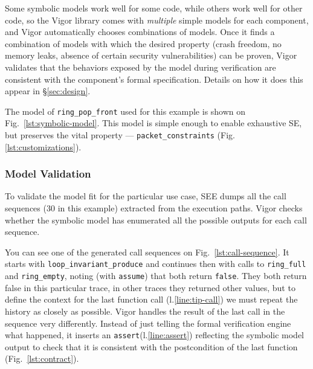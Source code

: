 \documentclass[letterpaper,twocolumn,10pt]{article}
\newcommand{\code}[1]{\lstinline{#1}}
\begin{document}
Some symbolic models work well for some code, while others work well for other
code, so the Vigor library comes with {\em multiple} simple models for each
component, and Vigor automatically chooses combinations of models. Once it finds
a combination of models with which the desired property (crash freedom, no
memory leaks, absence of certain security vulnerabilities) can be proven, Vigor
validates that the behaviors exposed by the model during verification are
consistent with the component's formal specification. Details on how it does
this appear in \S\ref{sec:design}.

The model of \code{ring_pop_front} used for this example is shown on
Fig.~\ref{lst:symbolic-model}. This model is simple enough to enable
exhaustive SE, but preserves the vital property --- \code{packet_constraints}
(Fig.\ref{lst:customizations}).

\subsubsection{Model Validation}

To validate the model fit for the particular use case, SEE dumps all the call
sequences (30 in this example) extracted from the execution paths. Vigor
checks whether the symbolic model has enumerated all the possible outputs for
each call sequence.

You can see one of the generated call sequences on Fig.~\ref{lst:call-sequence}.
It starts with \code{loop_invariant_produce} and continues then with calls to
\code{ring_full} and \code{ring_empty}, noting (with \code{assume}) that both
return \code{false}. They both return false in this particular trace, in other
traces they returned other values, but to define the context for the last
function call (l.\ref{line:tip-call}) we must repeat the history as closely as
possible. Vigor handles the result of the last call in the sequence very
differently. Instead of just telling the formal verification engine what
happened, it inserts an \code{assert}(l.\ref{line:assert}) reflecting the
symbolic model output to check that it is consistent with the postcondition of
the last function (Fig.~\ref{lst:contract}).
 
\end{document}
